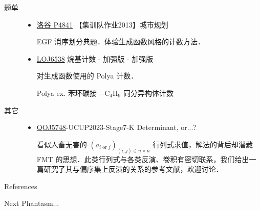\documentclass[fontset=fandol]{ctexbeamer}
\begin{document}
\begin{frame}[allowframebreaks]{题单}
\begin{description}
\begin{itemize}
        \item \href{https://www.luogu.com.cn/problem/P4841}{洛谷 P4841} 【集训队作业2013】城市规划

        EGF 消序划分典题．体验生成函数风格的计数方法．

        \item \href{https://loj.ac/p/6538}{LOJ6538} 烷基计数 - 加强版 - 加强版

        对生成函数使用的 Polya 计数．
        
        Polya ex. 苯环碳接 $\mathrm{-C_4H_9}$ 同分异构体计数
    \end{itemize}
    \item[其它] \begin{itemize}
        \item \href{https://qoj.ac/problem/5748}{QOJ5748}-UCUP2023-Stage7-K Determinant, or...?

        看似人畜无害的 $\left( a_{i \operatorname{or} j} \right)_{(i,j) \in n \times n}$ 行列式求值，解法的背后却潜藏 FMT 的思想．此类行列式与各类反演、卷积有密切联系，我们给出一篇研究了其与偏序集上反演的关系的参考文献\cite{wilf1968hadamard}，欢迎讨论．
    \end{itemize}
\end{description}
\end{frame}

\begin{frame}[allowframebreaks]{References}
    \printbibliography
\end{frame}

{
\begin{frame}[plain]
    
    {\large Next Phantasm...}
    
\end{frame}
}
\end{document}
